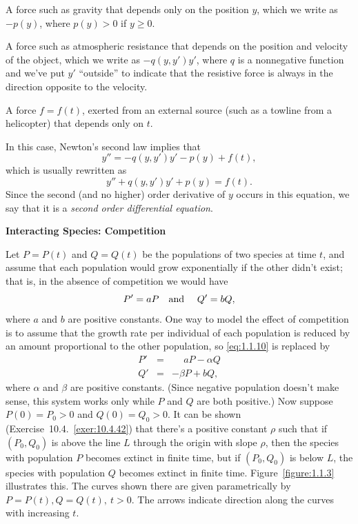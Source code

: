 \documentclass{ximera}
\begin{document}
\begin{alist}
\item %
A force such as gravity that depends only on the position $y$,
which we write as $-p(y)$, where $p(y)>0$ if $y\ge0$.

\item %
A force such as atmospheric resistance that depends on
the position and velocity of the object, which we write as
$-q(y,y')y'$, where $q$ is a nonnegative function and we've
put $y'$ ``outside'' to indicate that the resistive force is
always in the direction opposite to the velocity.
\item %
A force $f=f(t)$, exerted from an external source (such as a towline
from a helicopter) that depends only on $t$.
\end{alist}

In this case, Newton's second law implies that
$$
y''=-q(y,y')y'-p(y)+f(t),
$$
which is usually rewritten as
$$
y''+q(y,y')y'+p(y)=f(t).
$$
Since the  second (and no higher) order derivative of $y$ occurs in
this equation, we say that it is a {\color{blue}\it second order differential
equation\/}.


\textbf{Interacting Species: Competition}

\noindent
Let $P=P(t)$ and $Q=Q(t)$ be the populations of two species at time
$t$, and assume that each population would grow exponentially if the
other didn't exist; that is, in the absence of competition we would
have
\begin{equation} \label{eq:1.1.10}
P'=aP \mbox{\quad and \quad}Q'=bQ,
\end{equation}
where $a$ and $b$ are positive constants. One way to model the effect
of competition is to assume that the growth rate per individual of
each population is reduced by an amount proportional to the other
population, so \eqref{eq:1.1.10} is replaced by
\begin{eqnarray*}
P'&=&\phantom{-}aP-\alpha Q\\
Q'&=&-\beta P+bQ,
\end{eqnarray*}
where $\alpha$ and $\beta$ are positive constants. (Since negative
population doesn't make sense, this system works only while $P$ and
$Q$ are both positive.) Now suppose   $P(0)=P_0>0$ and
$Q(0)=Q_0>0$. It can be shown (Exercise~10.4.~\hspace*{-3pt}\ref{exer:10.4.42})
that there's a  positive constant $\rho$ such that if
$(P_0,Q_0)$ is above the line $L$ through the origin with slope $\rho$,
then the species with population $P$ becomes extinct in finite time,
but if $(P_0,Q_0)$ is below $L$,   the species with population
$Q$ becomes extinct in finite time. Figure~\ref{figure:1.1.3} illustrates
this. The curves shown there are given parametrically by $P=P(t),
Q=Q(t),\ t>0$.
 The arrows indicate direction along the curves with
increasing $t$.
\end{document}
